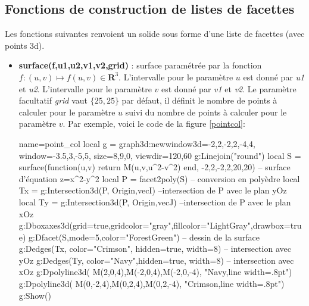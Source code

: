 \subsection{Fonctions de construction de listes de facettes}

Les fonctions suivantes renvoient un solide sous forme d'une liste de facettes (avec points 3d).
\begin{itemize}
    \item \textbf{surface(f,u1,u2,v1,v2,grid)} : surface paramétrée par la fonction $f\colon(u,v) \mapsto f(u,v)\in \mathbf R^3$. L'intervalle pour le paramètre $u$ est donné par \emph{u1} et \emph{u2}. L'intervalle pour le paramètre $v$ est donné par \emph{v1} et \emph{v2}. Le paramètre facultatif \emph{grid} vaut $\{25,25\}$ par défaut, il définit le nombre de points à calculer pour le paramètre $u$ suivi du nombre de points à calculer pour le paramètre $v$. Par exemple, voici le code de la figure \ref{pointcol}:
\begin{Luacode}
\begin{luadraw}{name=point_col}
local g = graph3d:new{window3d={-2,2,-2,2,-4,4}, window={-3.5,3,-5,5}, size={8,9,0}, viewdir={120,60}}
g:Linejoin("round")
local S = surface(function(u,v) return M(u,v,u^2-v^2) end, -2,2,-2,2,{20,20}) -- surface d'équation z=x^2-y^2
local P = facet2poly(S) -- conversion en polyèdre
local Tx = g:Intersection3d(P, {Origin,vecI}) --intersection de P avec le plan yOz
local Ty = g:Intersection3d(P, {Origin,vecJ}) --intersection de P avec le plan xOz
g:Dboxaxes3d({grid=true,gridcolor="gray",fillcolor="LightGray",drawbox=true})
g:Dfacet(S,{mode=5,color="ForestGreen"}) -- dessin de la surface
g:Dedges(Tx, {color="Crimson", hidden=true, width=8}) -- intersection avec yOz
g:Dedges(Ty, {color="Navy",hidden=true, width=8}) -- intersection avec xOz
g:Dpolyline3d( {M(2,0,4),M(-2,0,4),M(-2,0,-4)}, "Navy,line width=.8pt")
g:Dpolyline3d( {M(0,-2,4),M(0,2,4),M(0,2,-4)}, "Crimson,line width=.8pt")
g:Show()
\end{luadraw}
\end{Luacode}


\end{itemize}
